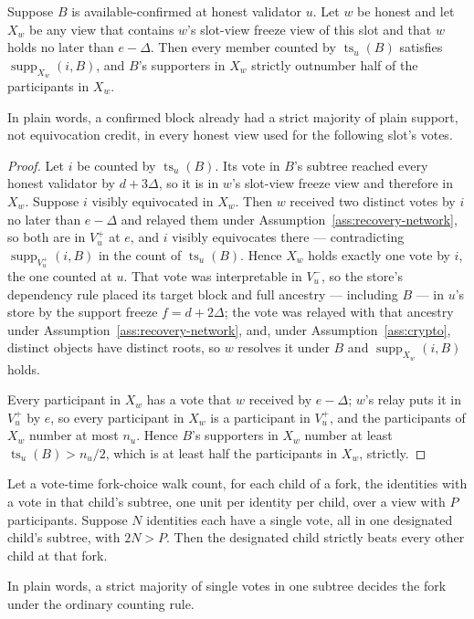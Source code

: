 \begin{lemma}
\label{lem:tsq-adoption}
Suppose \(B\) is available-confirmed at honest validator \(u\).  Let \(w\)
be honest and let \(X_w\) be any view that contains \(w\)'s slot-view
freeze view of this slot and that \(w\) holds no later than \(e-\Delta\).
Then every member counted by \(\operatorname{ts}_u(B)\) satisfies
\(\operatorname{supp}_{X_w}(i,B)\), and \(B\)'s supporters in \(X_w\)
strictly outnumber half of the participants in \(X_w\).

In plain words, a confirmed block already had a strict majority of plain
support, not equivocation credit, in every honest view used for the
following slot's votes.
\end{lemma}

\begin{proof}
Let \(i\) be counted by \(\operatorname{ts}_u(B)\).  Its vote in \(B\)'s subtree reached
every honest validator by \(d+3\Delta\), so it is in \(w\)'s slot-view
freeze view and therefore in \(X_w\).  Suppose \(i\) visibly equivocated
in \(X_w\).  Then \(w\) received two distinct votes by \(i\) no later than
\(e-\Delta\) and relayed them under Assumption~\ref{ass:recovery-network},
so both are in \(V_u^+\) at \(e\), and \(i\) visibly equivocates there ---
contradicting \(\operatorname{supp}_{V_u^+}(i,B)\) in the count of
\(\operatorname{ts}_u(B)\).  Hence \(X_w\) holds exactly one vote by \(i\), the one
counted at \(u\).  That vote was interpretable in \(V_u^-\), so the
store's dependency rule placed its target block and full ancestry ---
including \(B\) --- in \(u\)'s store by the support freeze
\(f=d+2\Delta\); the vote was relayed with that ancestry under
Assumption~\ref{ass:recovery-network},
and, under Assumption~\ref{ass:crypto}, distinct objects have distinct
roots, so \(w\) resolves it under \(B\) and
\(\operatorname{supp}_{X_w}(i,B)\) holds.

Every participant in \(X_w\) has a vote that \(w\) received by
\(e-\Delta\); \(w\)'s relay puts it in \(V_u^+\) by \(e\), so every
participant in \(X_w\) is a participant in \(V_u^+\), and the participants
of \(X_w\) number at most \(n_u\).  Hence \(B\)'s supporters in \(X_w\)
number at least \(\operatorname{ts}_u(B)>n_u/2\), which is at least half the participants
in \(X_w\), strictly.
\end{proof}

\begin{lemma}
\label{lem:fork-margin}
Let a vote-time fork-choice walk count, for each child of a fork, the
identities with a vote in that child's subtree, one unit per identity per
child, over a view with \(P\) participants.  Suppose \(N\) identities
each have a single vote, all in one designated child's subtree, with
\(2N>P\).  Then the designated child strictly beats every other child at
that fork.

In plain words, a strict majority of single votes in one subtree decides
the fork under the ordinary counting rule.
\end{lemma}

